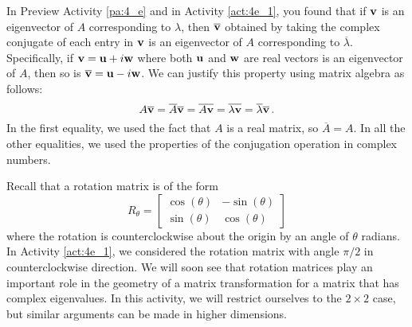 In Preview Activity \ref{pa:4_e} and in Activity \ref{act:4e_1}, you found that if $\mathbf{v}$ is an eigenvector of $A$ corresponding to $\lambda$, then $\overline{\mathbf{v}}$ obtained by taking the complex conjugate of each entry in $\mathbf{v}$ is an eigenvector of $A$ corresponding to $\overline{\lambda}$. Specifically, if $\mathbf{v}=\mathbf{u}+i\mathbf{w}$ where both $\mathbf{u}$ and $\mathbf{w}$ are real vectors is an eigenvector of $A$, then so is $\overline{\mathbf{v}} = \mathbf{u}-i\mathbf{w}$. We can justify this property using matrix algebra as follows:
\[ A\overline{\mathbf{v}} = \overline{A}\overline{\mathbf{v}} = \overline{A\mathbf{v}} = \overline{\lambda \mathbf{v}} = \overline{\lambda} \overline{\mathbf{v}} \, .\]
In the first equality, we used the fact that $A$ is a real matrix, so $\overline{A}=A$. In all the other equalities, we used the properties of the conjugation operation in complex numbers.

\label{sec:mtx_rotate_scale}

Recall that a rotation matrix is of the form 
\[ R_\theta= \left[ \begin{array}{cr} \cos(\theta)&-\sin(\theta) \\ \sin(\theta)&\cos(\theta) \end{array} \right]\]
where the rotation is counterclockwise about the origin by an angle of $\theta$ radians. In Activity \ref{act:4e_1}, we considered the rotation matrix with angle $\pi/2$ in counterclockwise direction. We will soon see that rotation matrices play an important role in the geometry of a matrix transformation for a matrix that has complex eigenvalues. In this activity, we will restrict ourselves to the $2 \times 2$ case, but similar arguments can be made in higher dimensions.



